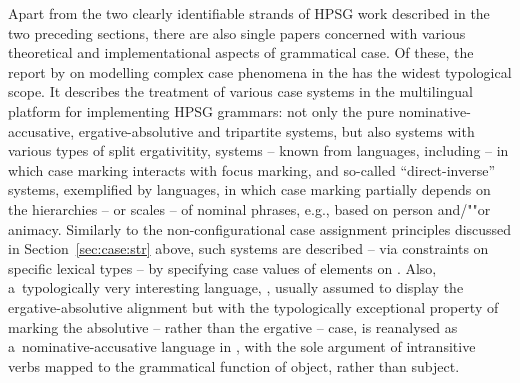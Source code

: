 \documentclass[output=paper
	        ,collection
	        ,collectionchapter
 	        ,biblatex
                ,babelshorthands
                ,newtxmath
                ,draftmode
                ,colorlinks, citecolor=brown
]{langscibook}
\begin{document}
\begin{exe}
\begin{xlist}
\begin{exe}
\begin{xlist}
Apart from the two clearly identifiable strands of HPSG work described in the two preceding sections, there are also single papers concerned with various theoretical and implementational aspects of grammatical case.  Of these, the report by \citet{drel:08} on modelling complex case phenomena in the  \citep{BFO2002a-u} has the widest typological scope.  It describes the treatment of various case systems in the multilingual platform for implementing HPSG grammars: not only the pure nominative-accusative, ergative-absolutive and tripartite systems, but also systems with various types of split ergativitity, systems – known from  languages, including  – in which case marking interacts with focus marking, and so-called “direct-inverse” systems, exemplified by  languages, in which case marking partially depends on the hierarchies – or scales – of nominal phrases, e.g., based on person and/""or animacy.  Similarly to the non-configurational case assignment principles discussed in Section~\ref{sec:case:str} above, such systems are described – via constraints on specific lexical types – by specifying case values of elements on .  Also, a~typologically very interesting language, , usually assumed to display the ergative-absolutive alignment but with the typologically exceptional property of marking the absolutive – rather than the ergative – case, is reanalysed as a~nominative-accusative language in \citet{Crysmann2009b-u}, with the sole argument of intransitive verbs mapped to the grammatical function of object, rather than subject.


\end{xlist}
\end{exe}
\end{xlist}
\end{exe}
\end{document}
